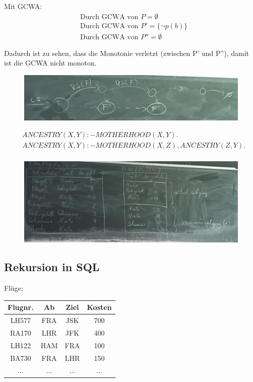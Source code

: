 \documentclass[12pt, a4paper]{article}
\begin{document}
Mit GCWA:
\begin{align*}
&\text{Durch GCWA von }P =  \emptyset \\
&\text{Durch GCWA von }P' = \{ \lnot p(b) \} \\
&\text{Durch GCWA von }P'' = \emptyset
\end{align*}

Dadurch ist zu sehen, dass die Monotonie verletzt (zwischen P' und P''), damit ist die GCWA nicht monoton.


\begin{figure}
\centering
\includegraphics[width=0.95\linewidth]{img/img16}
\caption{}
\label{fig:img16}
\end{figure}


\begin{align*}
& ANCESTRY(X,Y) :- MOTHERHOOD(X,Y). \\
& ANCESTRY(X,Y) :- MOTHERHOOD(X,Z), ANCESTRY(Z,Y). \\
\end{align*}


\begin{figure}
\centering
\includegraphics[width=0.95\linewidth]{img/img17}
\caption{}
\label{fig:img17}
\end{figure}

\subsection*{Rekursion in SQL}

Flüge: \\
\begin{tabular}{|c|c|c|c|}
\hline
Flugnr. & Ab & Ziel & Kosten \\ \hline
LH577 & FRA & JSK & 700 \\
RA170 & LHR & JFK & 400 \\
LH122 & HAM & FRA & 100 \\
BA730 & FRA & LHR & 150 \\ 
... & ... & ... & ... \\
\hline
\end{tabular}
\end{document}
